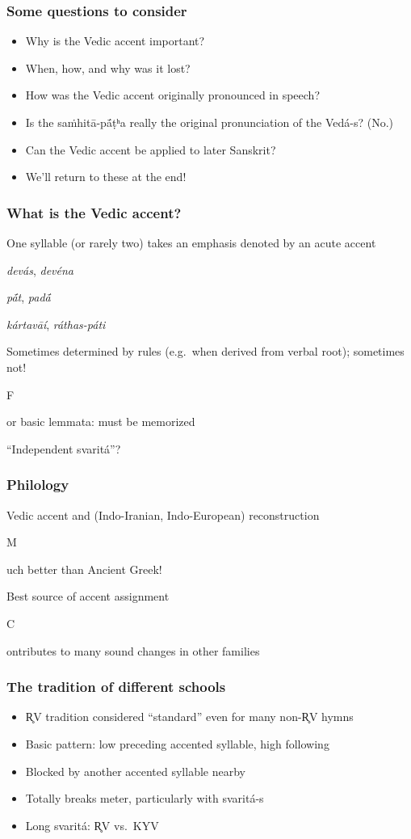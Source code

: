 \documentclass[pdf]{beamer}
\newcommand{\Subitem}[1]{{\setlength\itemindent{12pt} \item[-] #1}}
\begin{document}
\begin{frame}[label=questions] \frametitle{Some questions to consider}
\begin{itemize}
	\item Why is the Vedic accent important?
	\item When, how, and why was it lost?
	\item How was the Vedic accent originally pronounced in speech?
	\item Is the saṁhitā-pā́ṭʰa really the original pronunciation of the Vedá-s? (No.)
	\item Can the Vedic accent be applied to later Sanskrit?
	\item We'll return to these at the end!
\end{itemize}
\end{frame}

\begin{frame} \frametitle{What is the Vedic accent?}
\begin{itemize}
	\item One syllable (or rarely two) takes an emphasis denoted by an acute accent
	\Subitem {\textit{devás}, \textit{devéna}}
	\Subitem {\textit{pā́t}, \textit{padā́}}
	\Subitem {\textit{kártavāí}, \textit{ráthas-páti}}
	\item Sometimes determined by rules (e.g.~when derived from verbal root); sometimes not!
	\Subitem For basic lemmata: must be memorized
	\item ``Independent svaritá''?
\end{itemize}
\end{frame}

\begin{frame} \frametitle{Philology}
\begin{itemize}
	\item Vedic accent and (Indo-Iranian, Indo-European) reconstruction
	\Subitem Much better than Ancient Greek!
	\item Best source of accent assignment
	\Subitem Contributes to many sound changes in other families
\end{itemize}
\end{frame}

\begin{frame} \frametitle{The tradition of different schools}
\begin{itemize}
	\item R̥V tradition considered ``standard'' even for many non-R̥V hymns
	\item Basic pattern: low preceding accented syllable, high following
	\item Blocked by another accented syllable nearby
	\item Totally breaks meter, particularly with svaritá-s
	\item Long svaritá: R̥V vs.~KYV
\end{itemize}
\end{frame}
\end{document}
